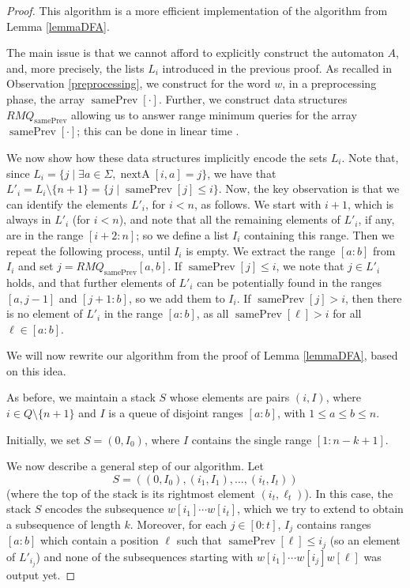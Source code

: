 \documentclass[runningheads,UKenglish,cleveref, autoref, thm-restate]{llncs}
\DeclareMathOperator{\prevArray}{samePrev}
\DeclareMathOperator{\nextpos}{nextA}
\begin{document}
\begin{proof}
This algorithm is a more efficient implementation of the algorithm from Lemma \ref{lemmaDFA}. 

The main issue is that we cannot afford to explicitly construct the automaton $A$, and, more precisely, the lists $L_i$ introduced in the previous proof.
As recalled in Observation \ref{preprocessing}, we construct for the word $w$, in a preprocessing phase, the array $\prevArray[\cdot]$. 
Further, we construct data structures $RMQ_{\prevArray}$ allowing us to answer range minimum queries for the array $\prevArray[\cdot]$; this can be done in linear time \cite{BenderF02}. 

We now show how these data structures implicitly encode the sets $L_i$. Note that, since $L_i=\{j\mid \exists a\in \Sigma, \nextpos[i,a]=j\}$, we have that $L'_i=L_i\setminus \{n+1\}=\{j\mid \prevArray[j]\leq i\}$. Now, the key observation is that we can identify the elements $L'_i$, for $i<n$, as follows. We start with $i+1$, which is always in $L'_i$ (for $i<n$), and note that all the remaining elements of $L'_i$, if any, are in the range $[i+2:n]$; so we define a list $I_i$ containing this range. Then we repeat the following process, until $I_i$ is empty. We extract the range $[a:b]$ from $I_i$ and set $j=RMQ_{\prevArray}[a,b]$. If $\prevArray[j]\leq i$, we note that $j\in L'_i$ holds, and that further elements of $L'_i$ can be potentially found in the ranges $[a,j-1]$ and $[j+1:b]$, so we add them to $I_i$. If $\prevArray[j]> i$, then there is no element of $L'_i$ in the range $[a:b]$, as all $\prevArray[\ell]>i$ for all $\ell\in [a:b]$.

We will now rewrite our algorithm from the proof of Lemma \ref{lemmaDFA}, based on this idea.

As before, we maintain a stack $S$ whose elements are pairs $(i,I)$, where $i\in Q\setminus \{n+1\}$ and $I$ is a queue of disjoint ranges $[a:b]$, with $1\leq a\leq b\leq n$. 

Initially, we set $S=(0,I_0)$, where $I$ contains the single range $[1:n-k+1]$. 

We now describe a general step of our algorithm. Let 
\[
S=((0,I_0), (i_1, I_1), \ldots, (i_t, I_t))
\]
(where the top of the stack is its rightmost element $(i_t, \ell_t)$). In this case, the stack $S$ encodes the subsequence $w[i_1]\cdots w[i_t]$, which we try to extend to obtain a subsequence of length $k$. Moreover, for each $j\in [0:t]$, $I_j$ contains ranges $[a:b]$ which contain a position $\ell$ such that $\prevArray[\ell]\leq i_j$ (so an element of $L'_{i_j}$) and none of the subsequences starting with $w[i_1]\cdots w[i_j]w[\ell]$ was output yet. 


\end{proof}
\end{document}
